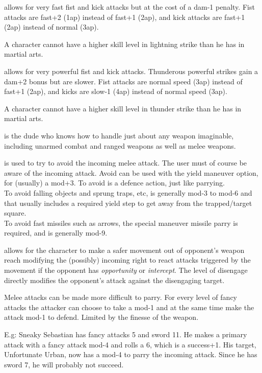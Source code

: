  allows for very fast fist and kick attacks but at the cost of a dam-1 penalty. Fist attacks are fast+2 (1ap) instead of fast+1 (2ap), and kick attacks are fast+1 (2ap) instead of normal (3ap).

A character cannot have a higher skill level in lightning strike than he has in martial arts.

 allows for very powerful fist and kick attacks.  Thunderous powerful strikes gain a dam+2 bonus but are slower. Fist attacks are normal speed (3ap) instead of fast+1 (2ap), and kicks are slow-1 (4ap) instead of normal speed (3ap).

A character cannot have a higher skill level in thunder strike than he has in martial arts.


 is the dude who knows how to handle just about any weapon imaginable, including unarmed combat and ranged weapons as well as melee weapons.


 is used to try to avoid the incoming melee attack. The user must of course be aware of the incoming attack. Avoid can be used with the yield maneuver option, for (usually) a mod+3. To avoid is a defence action, just like parrying. \\
To avoid falling objects and sprung traps, etc, is generally mod-3 to mod-6 and that usually includes a required yield step to get away from the trapped/target square. \\
To avoid fast missiles such as arrows, the special maneuver missile parry is required, and is generally mod-9.


 allows for the character to make a safer movement out of opponent's weapon reach modifying the (possibly) incoming right to react attacks triggered by the movement if the opponent has \emph{opportunity} or \emph{intercept}. The level of disengage directly modifies the opponent's attack against the disengaging target.


 Melee attacks can be made more difficult to parry. For every level of fancy attacks the attacker can choose to take a mod-1 and at the same time make the attack mod-1 to defend. Limited by the finesse of the weapon.

E.g: Sneaky Sebastian has fancy attacks 5 and sword 11. He makes a primary attack with a fancy attack mod-4 and rolls a 6, which is a success+1. His target, Unfortunate Urban, now has a mod-4 to parry the incoming attack. Since he has sword 7, he will probably not succeed.



